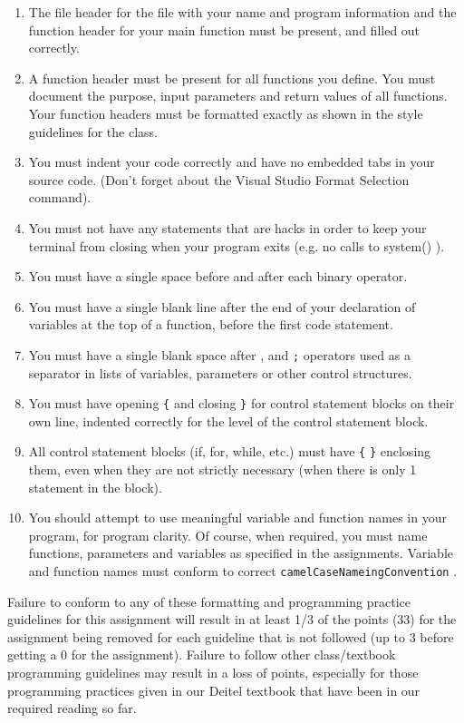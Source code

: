 \documentclass[11pt]{article}
\begin{document}
\begin{enumerate}
\item The file header for the file with your name and program information
and the function header for your main function must be present, and
filled out correctly.
\item A function header must be present for all functions you define.
You must document the purpose, input parameters and return values
of all functions.  Your function headers must be formatted exactly
as shown in the style guidelines for the class.
\item You must indent your code correctly and have no embedded tabs in
your source code. (Don't forget about the Visual Studio Format
Selection command).
\item You must not have any statements that are hacks in order to keep
your terminal from closing when your program exits (e.g. no calls
to system() ).
\item You must have a single space before and after each binary operator.
\item You must have a single blank line after the end of your declaration
of variables at the top of a function, before the first code
statement.
\item You must have a single blank space after , and \verb~;~ operators used as a
separator in lists of variables, parameters or other control
structures.
\item You must have opening \verb~{~ and closing \verb~}~ for control statement blocks
on their own line, indented correctly for the level of the control
statement block.
\item All control statement blocks (if, for, while, etc.) must have \verb~{~
\verb~}~ enclosing them, even when they are not strictly necessary
(when there is only 1 statement in the block).
\item You should attempt to use meaningful variable and function names in
your program, for program clarity.  Of course, when required, you
must name functions, parameters and variables as specified in the
assignments.  Variable and function names must conform to correct
\verb~camelCaseNameingConvention~ .
\end{enumerate}

Failure to conform to any of these formatting and programming practice
guidelines for this assignment will result in at least 1/3 of the
points (33) for the assignment being removed for each guideline that
is not followed (up to 3 before getting a 0 for the
assignment). Failure to follow other class/textbook programming
guidelines may result in a loss of points, especially for those
programming practices given in our Deitel textbook that have been in
our required reading so far.
\end{document}
